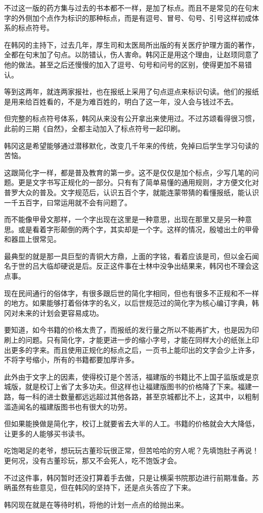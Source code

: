 不过这一版的药方集与过去的书本都不一样，是加了标点。而且不是常见的在句末字的外侧加个点作为标识的那种标点，而是有逗号、冒号、句号、引号这样初成体系的标点符号。

在韩冈的主持下，过去几年，厚生司和太医局所出版的有关医疗护理方面的著作，全都在句末加了句点。以防错认，伤人害命。韩冈正是用这个理由，让赵顼同意了他的做法。甚至之后还慢慢的加入了逗号、句号和问号的区别，使得更加不易错认。

等到这两年，就连两家报社，也在报纸上采用了句点逗点来标识句读。他们的报纸是用来给百姓看的，不是为难百姓的，明白了这一年，没人会与钱过不去。

但完整的标点符号体系，韩冈从来没有公开拿出来使用过。不过苏颂看得很习惯，此前的三期《自然》，全都主动加入了标点符号一起印刷。

韩冈这是希望能够通过潜移默化，改变几千年来的传统，免掉曰后学生学习句读的苦恼。

这跟简化字一样，都是普及教育的第一步。这不是仅仅是加个标点，少写几笔的问题。更是文字书写正规化的一部分。只有有了简单易懂的通用规则，才方便文化对普罗大众的普及。文字规范后，认识五百个字，就能连蒙带猜的看懂报纸，能认识一千五百字，曰常运用就不会有问题了。

而不能像甲骨文那样，一个字出现在这里是一种意思，出现在那里又是另一种意思。或是看着字形颠倒的两个字，其实却是一个字。这样的情况，殷墟出土的甲骨和器皿上很常见。

最典型的就是那一具巨型的青铜大方鼎，上面的字铭，看着应该是司，但以金石闻名于世的吕大临却硬说是后。反正这件事在士林中没争出结果来，韩冈也不理会这点事。

现在民间通行的俗体字，有很多跟后世的简化字相同，但也有很多不正规和不一样的地方。如果能够打着俗体字的名义，以后世规范过的简化字为核心编订字典，韩冈对未来的计划会更容易成功。

要知道，如今书籍的价格太贵了，而报纸的发行量之所以不能再扩大，也是因为印刷上的问题。只有简化字，才能更进一步的缩小字号，才能在同样大小的纸张上印出更多的字来。而且使用正规化的标点之后，一页书上能印出的文字会少上许多，不将字号缩小，所有的书籍都要加厚许多。

此外由于文字上的因素，使得校订是个苦活，福建版的书籍比不上国子监版或是京城版，就是校订上省了太多功夫。但这样也让福建版图书的价格降了下来。福建一路，每一科的进士数量都远远超过其他各路，甚至京城都比不上，这其中，以粗制滥造闻名的福建版图书也有很大的功劳。

但如果能换做是简化字，校订上就要省去大半的人工。书籍的价格就会大大降低，让更多的人能够买书读书。

吃饱喝足的老爷，想玩玩古董珍玩很正常，但苦哈哈的穷人呢？先填饱肚子再说！更何况，没有古董珍玩，那又不会死人，吃不饱饭才会。

不过这件事，韩冈暂时还没打算着手去做，只是让横渠书院那边进行前期准备。苏昞虽然有些意见，但在韩冈的坚持下，还是点头答应了下来。

韩冈现在就是在等待时机，将他的计划一点点的给抛出来。

